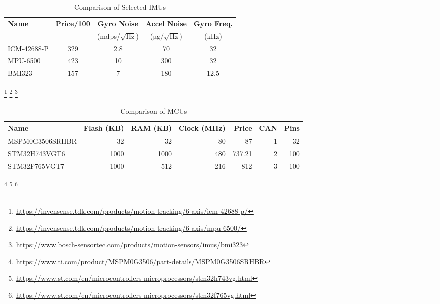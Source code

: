 \begin{table}[htbp]
  \centering
  \begin{tabular}{lcccc}
    \hline
    \textbf{Name} & \textbf{Price/100} & \textbf{Gyro Noise} & \textbf{Accel Noise} & \textbf{Gyro Freq.} \\
    & & (mdps/$\sqrt{\text{Hz}}$) & (µg/$\sqrt{\text{Hz}}$) & (kHz) \\
    \hline
    ICM-42688-P & 329 & 2.8 & 70 & 32 \\
    MPU-6500    & 423 & 10  & 300 & 32 \\
    BMI323      & 157 & 7   & 180 & 12.5 \\
    \hline
  \end{tabular}
  \caption{Comparison of Selected IMUs}
  \label{tab:imu-comparison}
\end{table}
\footnote{\url{https://invensense.tdk.com/products/motion-tracking/6-axis/icm-42688-p/}}
\footnote{\url{https://invensense.tdk.com/products/motion-tracking/6-axis/mpu-6500/}}
\footnote{\url{https://www.bosch-sensortec.com/products/motion-sensors/imus/bmi323}}


\begin{table}[htbp]
  \centering
  \begin{tabular}{lrrrrrr}
    \toprule
    \textbf{Name} & \textbf{Flash (KB)} & \textbf{RAM (KB)} & \textbf{Clock (MHz)} & \textbf{Price} & \textbf{CAN} & \textbf{Pins} \\
    \midrule
    MSPM0G3506SRHBR & 32 & 32 & 80 & 87 & 1 & 32 \\
    STM32H743VGT6 & 1000 & 1000 & 480 & 737.21 & 2 & 100 \\
    STM32F765VGT7 & 1000 & 512 & 216 & 812 & 3 & 100 \\
    \bottomrule
  \end{tabular}
   \caption{Comparison of MCUs}
  \label{tab:mcu-comparison}
\end{table}
\footnote{\url{https://www.ti.com/product/MSPM0G3506/part-details/MSPM0G3506SRHBR}}
\footnote{\url{https://www.st.com/en/microcontrollers-microprocessors/stm32h743vg.html}}
\footnote{\url{https://www.st.com/en/microcontrollers-microprocessors/stm32f765vg.html}}

